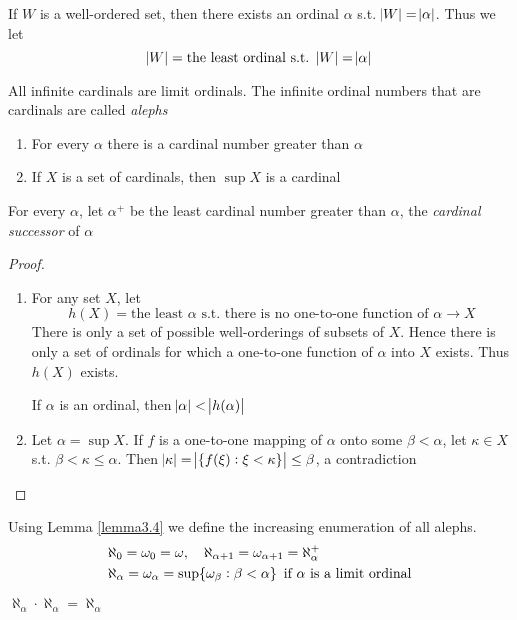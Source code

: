 \documentclass[11pt]{article}
\begin{document}
If \(W\) is a well-ordered set, then there exists an ordinal \(\alpha\) s.t.
\(\abs{W}=\abs{\alpha}\). Thus we let
\begin{equation*}
\abs{W}=\text{the least ordinal s.t. } \abs{W}=\abs{\alpha}
\end{equation*}

All infinite cardinals are limit ordinals. The infinite ordinal numbers that
are cardinals are called \emph{alephs}
\begin{lemma}[]
\label{lemma3.4}
\begin{enumerate}
\item For every \(\alpha\) there is a cardinal number greater than \(\alpha\)
\item If \(X\) is a set of cardinals, then \(\sup X\) is a cardinal
\end{enumerate}


For every \(\alpha\), let \(\alpha^+\) be the least cardinal number greater than
\(\alpha\), the \emph{cardinal successor} of \(\alpha\)
\end{lemma}
\begin{proof}
\begin{enumerate}
\item For any set \(X\), let
\begin{equation*}
h(X)=\text{the least }\alpha\text{ s.t. there is no one-to-one function of }
\alpha\to X
\end{equation*}
There is only a set of possible well-orderings of subsets of \(X\). Hence
there is only a set of ordinals for which a one-to-one function of \(\alpha\)
into \(X\) exists. Thus \(h(X)\) exists.

If \(\alpha\) is an ordinal, then \(\abs{\alpha}<\abs{h(\alpha)}\)
\item Let \(\alpha=\sup X\). If \(f\) is a one-to-one mapping of \(\alpha\) onto some
\(\beta<\alpha\), let \(\kappa\in X\) s.t. \(\beta<\kappa\le\alpha\). Then
\(\abs{\kappa}=\abs{\{f(\xi):\xi<\kappa\}}\le\beta\), a contradiction
\end{enumerate}
\end{proof}
Using Lemma \ref{lemma3.4} we define the increasing enumeration of all alephs.
\begin{align*}
&\aleph_0=\omega_0=\omega,\enspace\enspace\aleph_{\alpha+1}=\omega_{\alpha+1}=\aleph_\alpha^+\\
&\aleph_\alpha=\omega_\alpha=\sup\{\omega_\beta:\beta<\alpha\}\enspace
\text{if }\alpha\text{ is a limit ordinal}
\end{align*}
\begin{theorem}[]
\label{thm3.5}
\(\aleph_\alpha \cdot\aleph_\alpha=\aleph_\alpha\)
\end{theorem}
\end{document}
